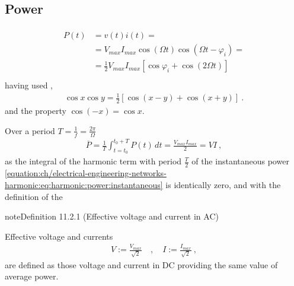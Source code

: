 \documentclass[letterpaper,10pt,english]{jupyterBook}
\begin{document}
\subsection{Power}
\label{\detokenize{ch/electrical-engineering-networks-harmonic:power}}\label{\detokenize{ch/electrical-engineering-networks-harmonic:classical-electromagnetism-electrical-engineering-newtork-analysis-harmonic-power}}
\sphinxAtStartPar
{}
\begin{equation}\label{equation:ch/electrical-engineering-networks-harmonic:eq:harmonic:power:instantaneous}
\begin{split}\begin{aligned}
  P(t) 
  & = v(t) i(t) = \\
  & = V_{max} I_{max}  \cos (\Omega t )  \cos (\Omega t - \varphi_i) = \\ 
  & = \frac{1}{2} V_{max} I_{max} \left[ \cos \varphi_i +  \cos ( 2 \Omega t ) \right]  \\ 
\end{aligned}\end{split}
\end{equation}
\sphinxAtStartPar
having used ,
\begin{equation*}
\begin{split}\cos x \cos y = \frac{1}{2} \left[ \cos(x-y) + \cos(x+y) \right] \ .\end{split}
\end{equation*}
\sphinxAtStartPar
and the property \(\cos(-x) = \cos x\).

\sphinxAtStartPar
{} Over a period \(T = \frac{1}{f} = \frac{2 \pi}{\Omega}\)
\begin{equation*}
\begin{split}\overline{P} = \frac{1}{T} \int_{t=t_0}^{t_0+T} P(t) \, dt = \frac{V_{max} I_{max}}{2} = V I\ ,\end{split}
\end{equation*}
\sphinxAtStartPar
as the integral of the harmonic term with period \(\frac{T}{2}\) of the instantaneous power \eqref{equation:ch/electrical-engineering-networks-harmonic:eq:harmonic:power:instantaneous} is identically zero, and with the definition of the 
\label{ch/electrical-engineering-networks-harmonic:harmonic:effective-values}
\begin{sphinxadmonition}{note}{Definition 11.2.1 (Effective voltage and current in AC)}



\sphinxAtStartPar
Effective voltage and currents
\begin{equation*}
\begin{split}V := \frac{V_{max}}{\sqrt{2}} \quad , \quad I := \frac{I_{max}}{\sqrt{2}} \ , \end{split}
\end{equation*}
\sphinxAtStartPar
are defined as those voltage and current in DC providing the same value of average power.
\end{sphinxadmonition}
\end{document}
